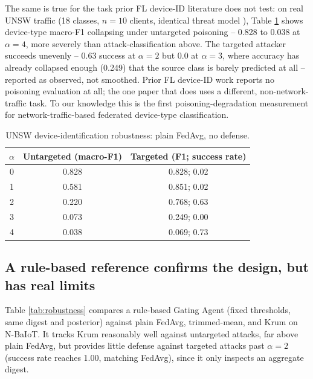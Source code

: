 \documentclass[conference]{IEEEtran}
\begin{document}
The same is true for the task prior FL device-ID literature does not test: on real UNSW traffic (18 classes, $n{=}10$ clients, identical threat model \cite{bagdasaryan2020backdoor}), Table \ref{tab:deviceid-robustness} shows device-type macro-F1 collapsing under untargeted poisoning -- 0.828 to 0.038 at $\alpha{=}4$, more severely than attack-classification above. The targeted attacker succeeds unevenly -- 0.63 success at $\alpha{=}2$ but 0.0 at $\alpha{=}3$, where accuracy has already collapsed enough (0.249) that the source class is barely predicted at all -- reported as observed, not smoothed. Prior FL device-ID work \cite{chen2025confeddi,wang2025fgliot,he2021edge} reports no poisoning evaluation at all; the one paper that does \cite{sanchez2021robust} uses a different, non-network-traffic task. To our knowledge this is the first poisoning-degradation measurement for network-traffic-based federated device-type classification.

\begin{table}[t]
\centering
\small
\caption{UNSW device-identification robustness: plain FedAvg, no defense.}
\label{tab:deviceid-robustness}
\begin{tabular}{@{}ccc@{}}
\toprule
$\alpha$ & \textbf{Untargeted (macro-F1)} & \textbf{Targeted (F1; success rate)} \\
\midrule
0 & 0.828 & 0.828; 0.02 \\
1 & 0.581 & 0.851; 0.02 \\
2 & 0.220 & 0.768; 0.63 \\
3 & 0.073 & 0.249; 0.00 \\
4 & 0.038 & 0.069; 0.73 \\
\bottomrule
\end{tabular}
\end{table}

\subsection{A rule-based reference confirms the design, but has real limits}
Table \ref{tab:robustness} compares a rule-based Gating Agent (fixed thresholds, same digest and posterior) against plain FedAvg, trimmed-mean, and Krum on N-BaIoT. It tracks Krum reasonably well against untargeted attacks, far above plain FedAvg, but provides little defense against targeted attacks past $\alpha{=}2$ (success rate reaches 1.00, matching FedAvg), since it only inspects an aggregate digest.
\end{document}
